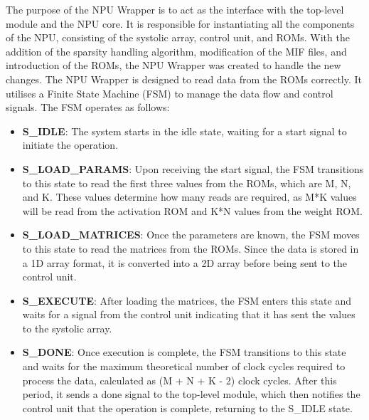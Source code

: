 \documentclass[12pt, a4paper, ukenglish]{article}
\begin{document}
        The purpose of the NPU Wrapper is to act as the interface with the top-level module and the NPU core. It is responsible for instantiating all the components of the NPU, consisting of the systolic array, control unit, and ROMs. With the addition of the sparsity handling algorithm, modification of the MIF files, and introduction of the ROMs, the NPU Wrapper was created to handle the new changes. 
        The NPU Wrapper is designed to read data from the ROMs correctly. It utilises a Finite State Machine (FSM) to manage the data flow and control signals. The FSM operates as follows:
        \begin{itemize}
            \item \textbf{S\_IDLE}: The system starts in the idle state, waiting for a start signal to initiate the operation.
            \item \textbf{S\_LOAD\_PARAMS}: Upon receiving the start signal, the FSM transitions to this state to read the first three values from the ROMs, which are M, N, and K. These values determine how many reads are required, as M*K values will be read from the activation ROM and K*N values from the weight ROM.
            \item \textbf{S\_LOAD\_MATRICES}: Once the parameters are known, the FSM moves to this state to read the matrices from the ROMs. Since the data is stored in a 1D array format, it is converted into a 2D array before being sent to the control unit.
            \item \textbf{S\_EXECUTE}: After loading the matrices, the FSM enters this state and waits for a signal from the control unit indicating that it has sent the values to the systolic array.
            \item \textbf{S\_DONE}: Once execution is complete, the FSM transitions to this state and waits for the maximum theoretical number of clock cycles required to process the data, calculated as (M + N + K - 2) clock cycles. After this period, it sends a done signal to the top-level module, which then notifies the control unit that the operation is complete, returning to the S\_IDLE state.
        \end{itemize}




    
    
\end{document}
